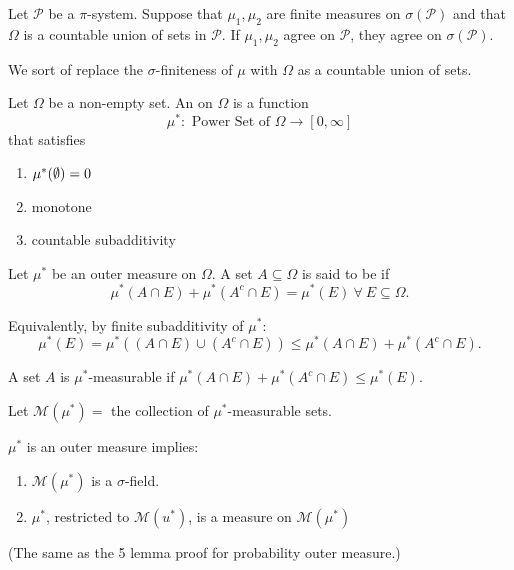 \documentclass[class=article,crop=false]{standalone}
\begin{document}
\begin{coro}[]
	Let $ \mathcal{P}$ be a $\pi$-system. Suppose that $ \mu_1, \mu_2$ are finite measures on $ \sigma(\mathcal{P})$ and that $ \Omega$ is a countable union of sets in $ \mathcal{P}$. If $ \mu_1, \mu_2$ agree on $ \mathcal{P}$, they agree on $ \sigma(\mathcal{P})$.
\end{coro}
\begin{intuition}[]
	We sort of replace the $ \sigma$-finiteness of $ \mu$ with $ \Omega$ as a countable union of sets.
\end{intuition}
\begin{defn}
Let $\Omega$ be a non-empty set. An  on $ \Omega$ is a function
\[
	\mu^* : \text{ Power Set of }\Omega \to [0, \infty] 
\] 
that satisfies
\begin{enumerate}[label=(\roman*)]
	\item $ \mu^* ( \emptyset) = 0$
	\item monotone
	\item countable subadditivity
\end{enumerate}
\end{defn}

\begin{defn}[]
	Let $ \mu^* $ be an outer measure on $ \Omega$. A set $ A \subseteq \Omega$ is said to be  if
	\[
		\mu^* (A \cap E) + \mu^* (A^{c} \cap E) = \mu^* (E) \ \forall \ E \subseteq \Omega
	.\] 
\end{defn}

Equivalently, by finite subadditivity of $ \mu^* $:
	\[
		\mu^* (E) = \mu^* ((A \cap E) \cup (A^{c} \cap  E)) \leq \mu^* (A \cap E) + \mu^* (A^{c} \cap E)
	.\] 

\begin{thm}[]
	A set $ A$ is  $ \mu^* $-measurable if $ \mu^* (A \cap E)+ \mu^* (A^{c} \cap E) \leq \mu^* (E)$.
\end{thm}

Let $ \mathcal{M}(\mu^*) =$ the collection of $ \mu^* $-measurable sets.

\begin{thm}[11.1]
$ \mu^* $ is an outer measure implies:
\begin{enumerate}[label=(\roman*)]
	\item $ \mathcal{M}(\mu^* )$ is a $\sigma$-field.
	\item $ \mu^* $, restricted to $ \mathcal{M}(u^* )$, is a measure on $ \mathcal{M}(\mu^* )$
\end{enumerate}
\end{thm}
(The same as the 5 lemma proof for probability outer measure.)
\end{document}
